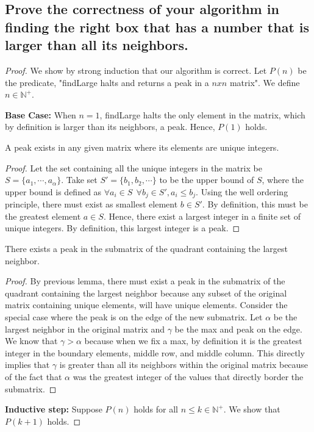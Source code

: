 \documentclass[11pt]{scrartcl}
\begin{document}
\subsection{
	Prove the correctness of your algorithm in finding the right box that has a number
	that is larger than all its neighbors.
}
\begin{proof}
	We show by strong induction that our algorithm is correct. Let $P(n)$ be the predicate,
	"findLarge halts and returns a peak in a $nxn$ matrix".
	We define $n \in \mathbb{N^{+}}$.
	\par \textbf{Base Case:} When $n = 1$, findLarge halts the only element in the matrix, which by definition
	is larger than its neighbors, a peak. Hence, $P(1)$ holds.
	\begin{theorem*}
		A peak exists in any given matrix where its elements are unique integers. 
		\begin{proof}
			Let the set 
			containing all the unique integers in the matrix be $S = \{a_1, \cdots, a_\alpha\}$. 	
			Take set $S' = \{b_1, b_2, \cdots\}$ to be the upper bound of $S$, 
			where the upper bound is defined as $ \forall a_i \in S \ \ \forall b_j \in S', a_i \leq b_j$.
			Using the well ordering principle, there must exist as smallest element $b \in S'$.
			By definition, this must be the greatest element $a \in S$. 
			Hence, there exist a largest integer in a finite set of unique integers. 
			By definition, this largest integer is a peak. 	
		\end{proof}
	\end{theorem*}
	\begin{corollary*}
		There exists a peak in the submatrix of the quadrant containing the largest neighbor.
		\begin{proof}
			By previous lemma, there must exist a peak in the submatrix of the quadrant containing the largest neighbor
			because any subset of the original matrix containing unique elements, will have unique elements. Consider the 
			special case where the peak is on the edge of the new submatrix. Let $\alpha$ be the largest neighbor in the original 
			matrix and $\gamma$ be the max and peak on the edge. We know that $\gamma > \alpha$ because when we fix a max, 
			by definition it is the
			greatest integer in the boundary elements, middle row, and middle column. This directly implies that $\gamma$
			is greater than all its neighbors within the original matrix because of the fact that $\alpha$ was the
			greatest integer of the values that directly border the submatrix. 
		\end{proof}
	\end{corollary*}	
	\par \textbf{Inductive step:} Suppose $P(n)$ holds for all $n \leq k \in \mathbb{N}^{+}$. We show that $P(k+1)$ holds.
	

\end{proof}
\end{document}
